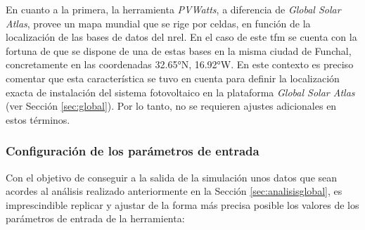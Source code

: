 \vspace{3mm}

En cuanto a la primera, la herramienta \textit{PVWatts}, a diferencia de \textit{Global Solar Atlas}, provee un mapa mundial que se rige por celdas, en función de la localización de las bases de datos del \gls{nrel}. En el caso de este \gls{tfm} se cuenta con la fortuna de que se dispone de una de estas bases en la misma ciudad de Funchal, concretamente en las coordenadas 32.65°N, 16.92°W. En este contexto es preciso comentar que esta característica se tuvo en cuenta para definir la localización exacta de instalación del sistema fotovoltaico en la plataforma \textit{Global Solar Atlas} (ver Sección \ref{sec:global}). Por lo tanto, no se requieren ajustes adicionales en estos términos.  

\subsubsection{Configuración de los parámetros de entrada}

Con el objetivo de conseguir a la salida de la simulación unos datos que sean acordes al análisis realizado anteriormente en la Sección \ref{sec:analisisglobal}, es imprescindible replicar y ajustar de la forma más precisa posible los valores de los parámetros de entrada de la herramienta: 

